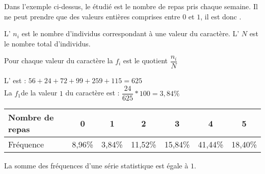 \documentclass[12pt,a4paper]{article}
\begin{document}
\begin{myex}
	
	Dans l'exemple ci-dessus, le  étudié est le nombre de repas pris chaque semaine. Il ne peut prendre que des valeurs entières comprises entre $0$ et $1$, il est donc .
	
	
\end{myex}

\begin{mydefs}
	L' $n_i$ est le nombre d'individus correspondant à une valeur du caractère. L' $N$ est le nombre total d'individus.
	
	Pour chaque valeur du caractère la  $f_i$ est le quotient $\dfrac{n_i}{N}$
\end{mydefs}		


\begin{myex}
	L' est : $56 + 24 + 72 + 99 + 259 + 115 = 625$\\
	
	La  $f_1$de la valeur $1$ du caractère est : $\dfrac{24}{625} * 100 = 3,84\%$ 

	\begin{center}
		
	
	\begin{tabular}{|@{\ }l@{\ }|@{\ }c@{\ }|@{\ }c@{\ }|@{\ }c@{\ }|@{\ }c@{\ }|@{\ }c@{\ }|@{\ }c@{\ }|}
		\hline
		Nombre de repas & 0 & 1 & 2 & 3 & 4 & 5 \\ \hline
		Fréquence & 8,96\% & 3,84\% & 11,52\% & 15,84\% & 41,44\% & 18,40\% \\ \hline
	\end{tabular}
	\end{center}
\end{myex}

\begin{myrem}
	La somme des fréquences d'une série statistique est égale à $1$.
\end{myrem}
\end{document}
